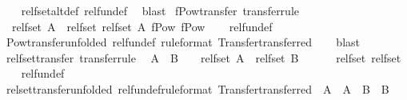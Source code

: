\begin{isabellebody}
%
\isadelimproof
\ \ %
\endisadelimproof
%
\isatagproof
{}\isamarkupfalse%
\ rel{\isacharunderscore}fset{\isacharunderscore}alt{\isacharunderscore}def\ rel{\isacharunderscore}fun{\isacharunderscore}def\ \isamarkupfalse%
\ blast%
\endisatagproof
{\isafoldproof}%
%
\isadelimproof
\isanewline
%
\endisadelimproof
\isanewline
\isanewline
{}\isamarkupfalse%
\ fPow{\isacharunderscore}transfer\ {\isacharbrackleft}transfer{\isacharunderscore}rule{\isacharbrackright}{\isacharcolon}\isanewline
\ \ {\isachardoublequoteopen}{\isacharparenleft}rel{\isacharunderscore}fset\ A\ {\isacharequal}{\isacharequal}{\isacharequal}{\isachargreater}\ rel{\isacharunderscore}fset\ {\isacharparenleft}rel{\isacharunderscore}fset\ A{\isacharparenright}{\isacharparenright}\ fPow\ fPow{\isachardoublequoteclose}\isanewline
%
\isadelimproof
\ \ %
\endisadelimproof
%
\isatagproof
{}\isamarkupfalse%
\ rel{\isacharunderscore}fun{\isacharunderscore}def\isanewline
\ \ \isamarkupfalse%
\ Pow{\isacharunderscore}transfer{\isacharbrackleft}unfolded\ rel{\isacharunderscore}fun{\isacharunderscore}def{\isacharcomma}\ rule{\isacharunderscore}format{\isacharcomma}\ Transfer{\isachardot}transferred{\isacharbrackright}\isanewline
\ \ \isamarkupfalse%
\ blast%
\endisatagproof
{\isafoldproof}%
%
\isadelimproof
\isanewline
%
\endisadelimproof
\isanewline
{}\isamarkupfalse%
\ rel{\isacharunderscore}fset{\isacharunderscore}transfer\ {\isacharbrackleft}transfer{\isacharunderscore}rule{\isacharbrackright}{\isacharcolon}\isanewline
\ \ {\isachardoublequoteopen}{\isacharparenleft}{\isacharparenleft}A\ {\isacharequal}{\isacharequal}{\isacharequal}{\isachargreater}\ B\ {\isacharequal}{\isacharequal}{\isacharequal}{\isachargreater}\ {\isacharparenleft}{\isacharequal}{\isacharparenright}{\isacharparenright}\ {\isacharequal}{\isacharequal}{\isacharequal}{\isachargreater}\ rel{\isacharunderscore}fset\ A\ {\isacharequal}{\isacharequal}{\isacharequal}{\isachargreater}\ rel{\isacharunderscore}fset\ B\ {\isacharequal}{\isacharequal}{\isacharequal}{\isachargreater}\ {\isacharparenleft}{\isacharequal}{\isacharparenright}{\isacharparenright}\isanewline
\ \ \ \ rel{\isacharunderscore}fset\ rel{\isacharunderscore}fset{\isachardoublequoteclose}\isanewline
%
\isadelimproof
\ \ %
\endisadelimproof
%
\isatagproof
{}\isamarkupfalse%
\ rel{\isacharunderscore}fun{\isacharunderscore}def\isanewline
\ \ \isamarkupfalse%
\ rel{\isacharunderscore}set{\isacharunderscore}transfer{\isacharbrackleft}unfolded\ rel{\isacharunderscore}fun{\isacharunderscore}def{\isacharcomma}rule{\isacharunderscore}format{\isacharcomma}\ Transfer{\isachardot}transferred{\isacharcomma}\ \ A\ {\isacharequal}\ A\ \ B\ {\isacharequal}\ B{\isacharbrackright}\isanewline

\end{isabellebody}
